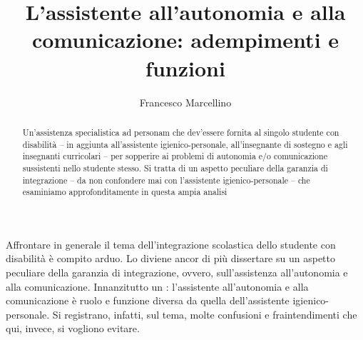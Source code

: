 
\author{Francesco Marcellino}
\title{L'assistente all'autonomia e alla comunicazione: adempimenti e funzioni}
\label{cha:marcellino120609}
\maketitle
{}
\begin{abstract}
	Un'assistenza specialistica ad personam che dev'essere fornita al singolo studente con disabilità – in aggiunta all'assistente igienico-personale, all'insegnante di sostegno e agli insegnanti curricolari – per sopperire ai problemi di autonomia e/o comunicazione sussistenti nello studente stesso. Si tratta di un aspetto peculiare della garanzia di integrazione – da non confondere mai con l'assistente igienico-personale – che esaminiamo approfonditamente in questa ampia analisi
\end{abstract}
Affrontare in generale il tema dell'integrazione scolastica dello studente con disabilità è compito arduo. Lo diviene ancor di più dissertare su un aspetto peculiare della garanzia di integrazione, ovvero, sull'assistenza all'autonomia e alla comunicazione.
Innanzitutto un : l'assistente all'autonomia e alla comunicazione è ruolo e funzione diversa da quella dell'assistente igienico-personale. Si registrano, infatti, sul tema, molte confusioni e fraintendimenti che qui, invece, si vogliono evitare.

